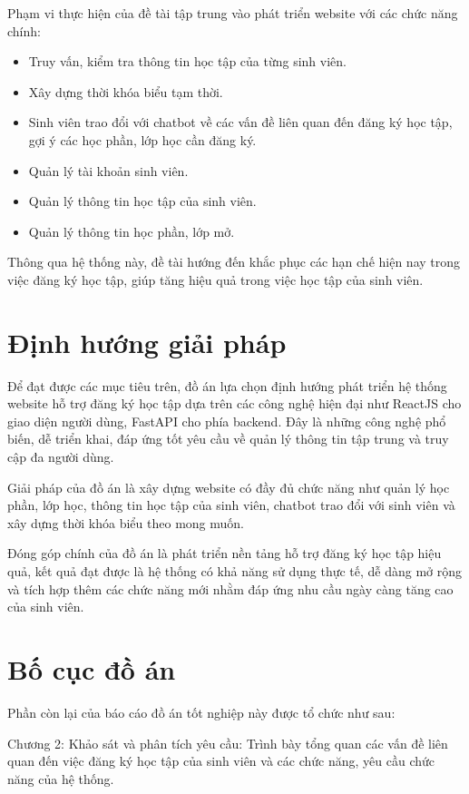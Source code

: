 \documentclass[12pt,a4paper]{report}
\begin{document}
Phạm vi thực hiện của đề tài tập trung vào phát triển website với các chức năng chính:
\begin{itemize}
    \item Truy vấn, kiểm tra thông tin học tập của từng sinh viên.
    \item Xây dựng thời khóa biểu tạm thời.
    \item Sinh viên trao đổi với chatbot về các vấn đề liên quan đến đăng ký học tập, gợi ý các học phần, lớp học cần đăng ký.
    \item Quản lý tài khoản sinh viên.
    \item Quản lý thông tin học tập của sinh viên.
    \item Quản lý thông tin học phần, lớp mở.
\end{itemize}
Thông qua hệ thống này, đề tài hướng đến khắc phục các hạn chế hiện nay trong việc đăng ký học tập, giúp tăng hiệu quả trong việc học tập của sinh viên.

\section{Định hướng giải pháp}
Để đạt được các mục tiêu trên, đồ án lựa chọn định hướng phát triển hệ thống website hỗ trợ đăng ký học tập dựa trên các công nghệ hiện đại như ReactJS cho giao diện người dùng, FastAPI cho phía backend. Đây là những công nghệ phổ biến, dễ triển khai, đáp ứng tốt yêu cầu về quản lý thông tin tập trung và truy cập đa người dùng.


Giải pháp của đồ án là xây dựng website có đầy đủ chức năng như quản lý học phần, lớp học, thông tin học tập của sinh viên, chatbot trao đổi với sinh viên và xây dựng thời khóa biểu theo mong muốn.


Đóng góp chính của đồ án là phát triển nền tảng hỗ trợ đăng ký học tập hiệu quả, kết quả đạt được là hệ thống có khả năng sử dụng thực tế, dễ dàng mở rộng và tích hợp thêm các chức năng mới nhằm đáp ứng nhu cầu ngày càng tăng cao của sinh viên.


\section{Bố cục đồ án}
Phần còn lại của báo cáo đồ án tốt nghiệp này được tổ chức như sau: 

Chương 2: Khảo sát và phân tích yêu cầu: Trình bày tổng quan các vấn đề liên quan đến việc đăng ký học tập của sinh viên và các chức năng, yêu cầu chức năng của hệ thống.
\end{document}

